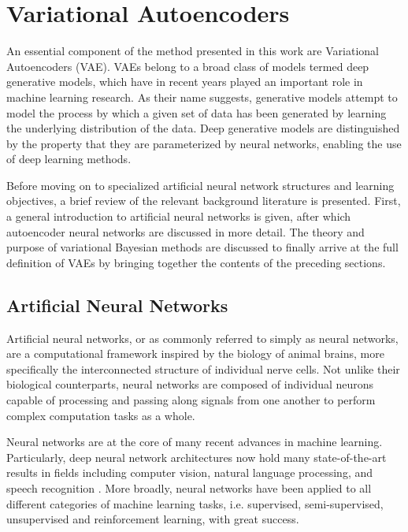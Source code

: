 \section{Variational Autoencoders}
\label{section:variational_autoencoders}

An essential component of the method presented in this work are Variational Autoencoders (VAE). VAEs belong to a broad class of models termed deep generative models, which have in recent years played an important role in machine learning research. As their name suggests, generative models attempt to model the process by which a given set of data has been generated by learning the underlying distribution of the data. Deep generative models are distinguished by the property that they are parameterized by neural networks, enabling the use of deep learning methods.



Before moving on to specialized artificial neural network structures and learning objectives, a brief review of the relevant background literature is presented. First, a general introduction to artificial neural networks is given, after which autoencoder neural networks are discussed in more detail. The theory and purpose of variational Bayesian methods are discussed to finally arrive at the full definition of VAEs by bringing together the contents of the preceding sections.

\subsection{Artificial Neural Networks}
\label{section:artificial_neural_networks}

Artificial neural networks, or as commonly referred to simply as neural networks, are a computational framework inspired by the biology of animal brains, more specifically the interconnected structure of individual nerve cells. Not unlike their biological counterparts, neural networks are composed of individual neurons capable of processing and passing along signals from one another to perform complex computation tasks as a whole.

Neural networks are at the core of many recent advances in machine learning. Particularly, deep neural network architectures now hold many state-of-the-art results in fields including computer vision, natural language processing, and speech recognition \cite{deep_learning}. More broadly, neural networks have been applied to all different categories of machine learning tasks, i.e. supervised, semi-supervised, unsupervised and reinforcement learning, with great success.

